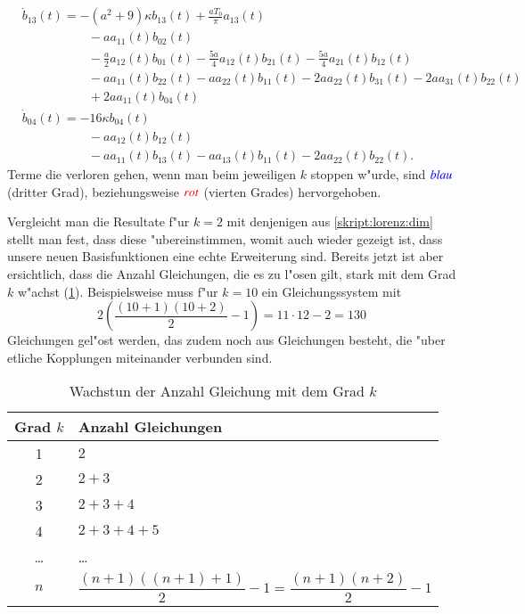\begin{align*}
\\
&
\dot{b}_{13}(t)
=
-
(a^2+9)
\kappa
b_{13}(t)
+
\frac{a T_{0}}{\pi} a_{13}(t)
\\
&\phantom{aaaaaaaaaa}
-
a
a_{11}(t) b_{02}(t)
\\
&\phantom{aaaaaaaaaa}
-
\frac{a}{2} a_{12}(t) b_{01}(t)
-
\frac{5 a}{4} a_{12}(t) b_{21}(t)
-
\frac{5 a}{4} a_{21}(t) b_{12}(t)
\\
&\phantom{aaaaaaaaaa}
-
a
a_{11}(t) b_{22}(t)
-
a
a_{22}(t) b_{11}(t)
-
2 a
a_{22}(t) b_{31}(t)
-
2 a
a_{31}(t) b_{22}(t)
\\
&\phantom{aaaaaaaaaa}
+
2 a
a_{11}(t) b_{04}(t)
\\
&
\dot{b}_{04}(t)
=
-
16
\kappa
b_{04}(t)
\\
&\phantom{aaaaaaaaaa}
-
a
a_{12}(t) b_{12}(t)
\\
&\phantom{aaaaaaaaaa}
-
a
a_{11}(t) b_{13}(t)
-
a
a_{13}(t) b_{11}(t)
-
2a
a_{22}(t) b_{22}(t).
\end{align*}
Terme die verloren gehen, wenn man beim jeweiligen $k$ stoppen w"urde, sind 
$\color{blue}{blau}$ (dritter Grad), beziehungsweise $\color{red}{rot}$ 
(vierten Grades) hervorgehoben.

Vergleicht man die Resultate f"ur $k = 2$ mit denjenigen aus 
\cref{skript:lorenz:dim} stellt man fest, dass diese "ubereinstimmen, womit 
auch wieder gezeigt ist, dass unsere neuen Basisfunktionen eine echte 
Erweiterung sind. Bereits jetzt ist aber ersichtlich, dass die Anzahl 
Gleichungen, die es zu l"osen gilt, stark mit dem Grad $k$ w"achst 
(\cref{table:lorenz2:degree}). Beispielsweise muss f"ur $k = 10$ ein 
Gleichungssystem mit
\begin{equation*}
	2\left(\frac{(10 + 1)(10 + 2)}{2} - 1\right) = 11 \cdot 12 - 2 = 130
\end{equation*}
Gleichungen gel"ost werden, das zudem noch aus Gleichungen besteht, die "uber 
etliche Kopplungen miteinander verbunden sind.

\begin{table}
	\centering
	\begin{tabular}{c | l}
		Grad $k$ & Anzahl Gleichungen \\
		\hline
		1 & $2$ \\
		2 & $2 + 3$ \\
		3 & $2 + 3 + 4$\\
		4 & $2 + 3 + 4 + 5$\\
		\dots & \dots \\
		$n$ & $\dfrac{(n + 1)((n + 1) + 1)}{2} - 1
		= \dfrac{(n + 1)(n + 2)}{2} - 1$
	\end{tabular}
	\caption{Wachstun der Anzahl Gleichung mit dem Grad $k$}
	\label{table:lorenz2:degree}
\end{table}
